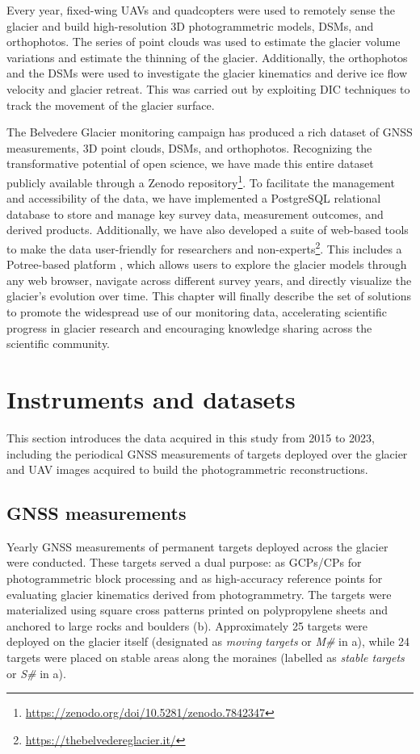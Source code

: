 Every year, fixed-wing UAVs and quadcopters were used to remotely sense the glacier and build high-resolution 3D photogrammetric models, DSMs, and orthophotos.
The series of point clouds was used to estimate the glacier volume variations and estimate the thinning of the glacier.
Additionally, the orthophotos and the DSMs were used to investigate the glacier kinematics and derive ice flow velocity and glacier retreat. 
This was carried out by exploiting DIC techniques to track the movement of the glacier surface.

The Belvedere Glacier monitoring campaign has produced a rich dataset of GNSS measurements, 3D point clouds, DSMs, and orthophotos. 
Recognizing the transformative potential of open science, we have made this entire dataset publicly available through a Zenodo repository\footnote{\url{https://zenodo.org/doi/10.5281/zenodo.7842347}}.
To facilitate the management and accessibility of the data, we have implemented a PostgreSQL relational database to store and manage key survey data, measurement outcomes, and derived products. 
Additionally, we have also developed a suite of web-based tools to make the data user-friendly for researchers and non-experts\footnote{\url{https://thebelvedereglacier.it/}}.
This includes a Potree-based platform \citep{schutz2016potree}, which allows users to explore the glacier models through any web browser, navigate across different survey years, and directly visualize the glacier's evolution over time.
This chapter will finally describe the set of solutions to promote the widespread use of our monitoring data, accelerating scientific progress in glacier research and encouraging knowledge sharing across the scientific community.

\section{Instruments and datasets}\label{sec:3:instrument}
 
This section introduces the data acquired in this study from 2015 to 2023, including the periodical GNSS measurements of targets deployed over the glacier and UAV images acquired to build the photogrammetric reconstructions.

\subsection{GNSS measurements}\label{sec:3:gnss}

Yearly GNSS measurements of permanent targets deployed across the glacier were conducted. 
These targets served a dual purpose: as GCPs/CPs for photogrammetric block processing and as high-accuracy 
reference points for evaluating glacier kinematics derived from photogrammetry. 
The targets were materialized using square cross patterns printed on polypropylene sheets and anchored to 
large rocks and boulders (b).
Approximately 25 targets were deployed on the glacier itself (designated as \textit{moving targets} or 
\textit{M\#} in a), while 24 targets were placed on stable areas along the moraines 
(labelled as \textit{stable targets} or \textit{S\#} in a). 

